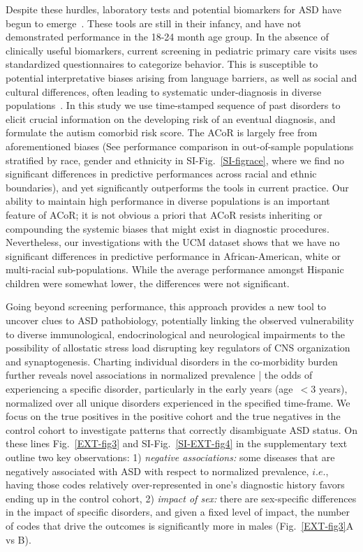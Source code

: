 \documentclass[onecolumn,10pt]{IEEEtran}
\def\treatment{positive\xspace}
\def\acor{ACoR\xspace}
\begin{document}
Despite these hurdles, laboratory tests and potential biomarkers for ASD have begun to emerge~\cite{smith2020metabolomics,howsmon2017classification,hicks2018validation}. These tools are still in their infancy, and have not demonstrated performance in the 18-24 month age group. In the absence of clinically useful biomarkers,  current screening in pediatric primary care visits uses standardized  questionnaires to categorize behavior. This is  susceptible to potential interpretative biases arising from language barriers, as well as social and cultural differences, often leading to systematic under-diagnosis in diverse populations~\cite{hyman2020identification}. In this study we use  time-stamped sequence of past  disorders  to elicit crucial information on the developing risk of an eventual  diagnosis, and formulate the autism comorbid risk score. The \acor is largely free from aforementioned  biases (See performance comparison in out-of-sample populations stratified by race, gender and ethnicity in SI-Fig.~\ref{SI-figrace}, where we find no significant differences in predictive performances across racial and ethnic boundaries), and yet significantly outperforms the tools in current practice. Our ability to maintain high performance in diverse populations is an important feature of \acor; it is not obvious a priori that \acor resists  inheriting or compounding the systemic biases that might exist in diagnostic procedures.  Nevertheless, our investigations with the UCM dataset shows that we have no significant differences in predictive performance in  African-American, white or multi-racial sub-populations. While the average performance amongst Hispanic children were somewhat lower, the differences  were not significant. 

Going beyond screening performance, this approach provides a new tool to uncover clues to ASD pathobiology, potentially linking  the observed vulnerability to  diverse immunological, endocrinological  and neurological impairments to the possibility of allostatic  stress load  disrupting key regulators of  CNS  organization and  synaptogenesis. Charting individual disorders in the co-morbidity burden further reveals novel associations in normalized prevalence | the odds of experiencing a specific disorder, particularly in the early years (age~$<3$ years), normalized over all unique disorders experienced in the specified time-frame. We focus on  the true positives in the \treatment cohort and the true negatives in the control cohort to investigate  patterns that correctly disambiguate  ASD status. On these lines  Fig.~\ref{EXT-fig3} and SI-Fig.~\ref{SI-EXT-fig4}  in the supplementary text outline two key  observations: 1) \textit{negative associations:} some  diseases that are negatively associated with ASD  with respect to normalized prevalence, $i.e.$, having those codes relatively  over-represented  in one's diagnostic history favors ending up in the control cohort, 2) \textit{impact of sex:} there are sex-specific differences in the impact of specific disorders,  and given a fixed level of impact, the number of codes that drive the outcomes is significantly more in males (Fig.~\ref{EXT-fig3}A vs B).
\end{document}
